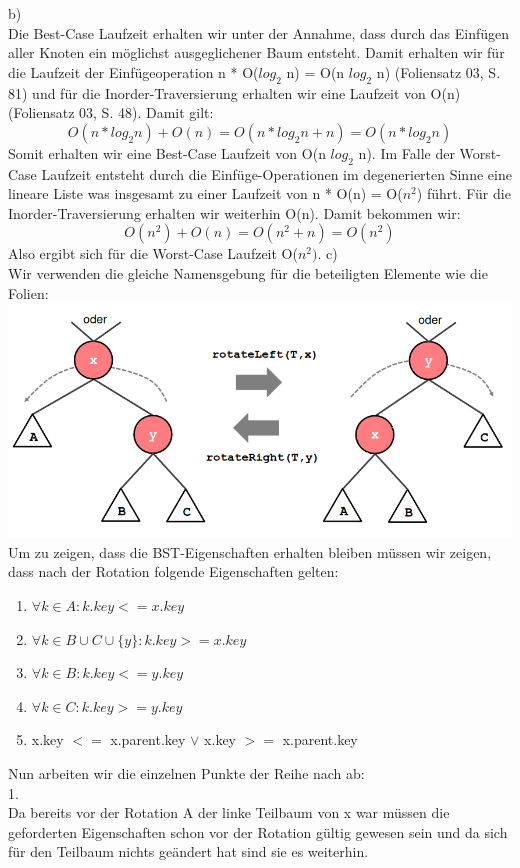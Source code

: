 \documentclass{article}
\begin{document}
\bigskip
\noindent b) \\ 
Die Best-Case Laufzeit erhalten wir unter der Annahme, dass durch das Einfügen aller
Knoten ein möglichst ausgeglichener Baum entsteht. Damit erhalten wir für die Laufzeit der 
Einfügeoperation n * O($log_2$ n) = O(n $log_2$ n) (Foliensatz 03, S. 81) und für die Inorder-Traversierung erhalten wir 
eine Laufzeit von O(n) (Foliensatz 03, S. 48). Damit gilt:
\[
    O(n*log_2 n) + O(n) = O(n*log_2 n + n) = O(n * log_2 n)
\]
Somit erhalten wir eine Best-Case Laufzeit von O(n $log_2$ n).
Im Falle der Worst-Case Laufzeit entsteht durch die Einfüge-Operationen im degenerierten Sinne 
eine lineare Liste was insgesamt zu einer Laufzeit von n * O(n) = O($n^2$) führt. Für die Inorder-Traversierung 
erhalten wir weiterhin O(n). Damit bekommen wir:
\[
    O(n^2) + O(n) = O(n^2 + n) = O(n^2) 
\]
Also ergibt sich für die Worst-Case Laufzeit O($n^2)$.
\bigskip
\noindent c) \\ 
Wir verwenden die gleiche Namensgebung für die beteiligten Elemente 
wie die Folien: \\
\includegraphics[scale=0.5]{ h1_a15 } \\ 
\bigskip
Um zu zeigen, dass die BST-Eigenschaften erhalten bleiben müssen wir zeigen,
dass nach der Rotation folgende Eigenschaften gelten:
\begin{enumerate}
    \item $\forall k \in A : k.key <= x.key$  
    \item $\forall k \in B \cup C \cup \{y\} : k.key >= x.key$
    \item $\forall k \in B : k.key <= y.key$
    \item $\forall k \in C : k.key >= y.key$
    \item x.key $<=$ x.parent.key $\vee$ x.key $>=$ x.parent.key  
\end{enumerate}

\smallskip
\noindent Nun arbeiten wir die einzelnen Punkte der Reihe nach ab: \\  
1. \\ 
\setlength\leftskip{1.5cm}
Da bereits vor der Rotation A der linke Teilbaum von x war 
müssen die geforderten Eigenschaften schon vor der Rotation gültig 
gewesen sein und da sich für den Teilbaum nichts geändert hat sind
sie es weiterhin. \\ 
\end{document}
